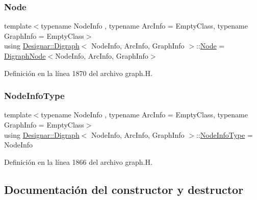 \subsubsection{\texorpdfstring{Node}{Node}}
{\footnotesize\ttfamily template$<$typename Node\+Info , typename Arc\+Info  = Empty\+Class, typename Graph\+Info  = Empty\+Class$>$ \\
using \hyperlink{class_designar_1_1_digraph}{Designar\+::\+Digraph}$<$ Node\+Info, Arc\+Info, Graph\+Info $>$\+::\hyperlink{class_designar_1_1_digraph_a4dc921c41a480b7946a04170e997d8ae}{Node} =  \hyperlink{class_designar_1_1_digraph_node}{Digraph\+Node}$<$Node\+Info, Arc\+Info, Graph\+Info$>$}



Definición en la línea 1870 del archivo graph.\+H.

\mbox{\label{class_designar_1_1_digraph_a6438608ff27cb6f017705e18bd7fc478}} 
\subsubsection{\texorpdfstring{Node\+Info\+Type}{NodeInfoType}}
{\footnotesize\ttfamily template$<$typename Node\+Info , typename Arc\+Info  = Empty\+Class, typename Graph\+Info  = Empty\+Class$>$ \\
using \hyperlink{class_designar_1_1_digraph}{Designar\+::\+Digraph}$<$ Node\+Info, Arc\+Info, Graph\+Info $>$\+::\hyperlink{class_designar_1_1_digraph_a6438608ff27cb6f017705e18bd7fc478}{Node\+Info\+Type} =  Node\+Info}



Definición en la línea 1866 del archivo graph.\+H.



\subsection{Documentación del constructor y destructor}
\mbox{\label{class_designar_1_1_digraph_ae57ac8513bfcb29602cc08a3d4bc7485}} 
